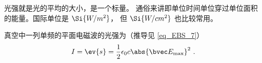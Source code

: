 
\begin{issues}
\issueDraft
\end{issues}

光强就是光的平均的大小，是一个标量。 通俗来讲即单位时间单位穿过单位面积的能量。国际单位是 $\Si{W/m^2}$， 但 $\Si{W/cm^2}$ 也比较常用。

真空中一列单频的平面电磁波的光强为（推导见 \autoref{eq_EBS_7}）
\begin{equation}
I = \ev{s} = \frac{1}{2} \epsilon_0 c \abs{\bvec E_\text{max}}^2~.
\end{equation}
